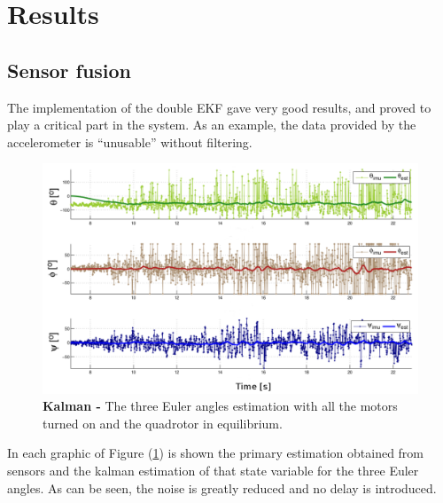 \documentclass[conference]{IEEEtran}
\newcommand{\refp}[1]{(\ref{#1})}
\begin{document}

\section{Results}
\vspace{-0.2cm}
\subsection{Sensor fusion}
\vspace{-0.2cm}
The implementation of the double EKF gave very good results, and proved to play a critical part in the system. As an example, the data provided by the accelerometer is ``unusable'' without filtering.
\begin{figure}
 \centering
	\includegraphics[width=.7\columnwidth]{./pics_paper/kalman.pdf}
	\caption{\textbf{Kalman -} The three Euler angles estimation with all the motors turned on and the quadrotor in equilibrium.}
	\label{fig:kalman}
	\vspace{-0.5cm}
\end{figure}

In each graphic of Figure \refp{fig:kalman} is shown the primary estimation obtained from sensors and the kalman estimation of that state variable for the three Euler angles. As can be seen, the noise is greatly reduced and no delay is introduced.
\end{document}
